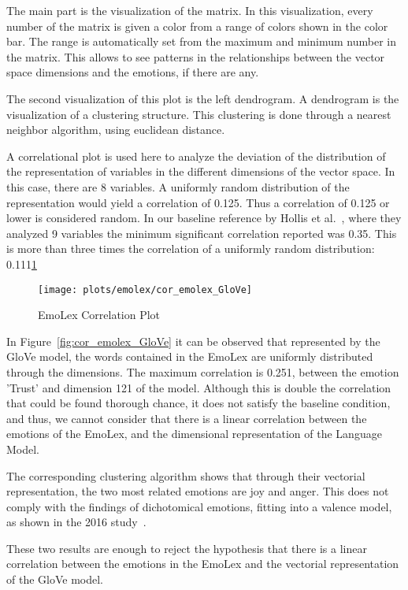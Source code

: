 The main part is the visualization of the matrix. In this visualization, every number of the matrix is given a color from a range of colors shown in the color bar. The range is automatically set from the maximum and minimum number in the matrix. This allows to see patterns in the relationships between the vector space dimensions and the emotions, if there are any.

The second visualization of this plot is the left dendrogram. A dendrogram is the visualization of a clustering structure. This clustering is done through a nearest neighbor algorithm, using euclidean distance.

A correlational plot is used here to analyze the deviation of the distribution of the representation of variables in the different dimensions of the vector space. In this case, there are 8 variables. A uniformly random distribution of the representation would yield a correlation of 0.125. Thus a correlation of  0.125 or lower is considered random. In our baseline reference by Hollis et al.~\cite{hollis2016principals}, where they analyzed 9 variables the minimum significant correlation reported was 0.35. This is more than three times the correlation of a uniformly random distribution: 0.111\underline{1}

\begin{figure}[H]
  \texttt{[image: plots/emolex/cor\_emolex\_GloVe]}
  \centering
  \caption{EmoLex Correlation Plot}
\end{figure}\label{fig:cor_emolex_GloVe}

In Figure~\ref{fig:cor_emolex_GloVe} it can be observed that represented by the GloVe model, the words contained in the EmoLex are uniformly distributed through the dimensions. The maximum correlation is 0.251, between the emotion 'Trust' and dimension 121 of the model. Although this is double the correlation that could be found thorough chance, it does not satisfy the baseline condition, and thus, we cannot consider that there is a linear correlation between the emotions of the EmoLex, and the dimensional representation of the Language Model.

The corresponding clustering algorithm shows that through their vectorial representation, the two most related emotions are joy and anger. This does not comply with the findings of dichotomical emotions, fitting into a valence model, as shown in the 2016 study~\cite{barradas2016thesis}.

These two results are enough to reject the hypothesis that there is a linear correlation between the emotions in the EmoLex and the vectorial representation of the GloVe model.


